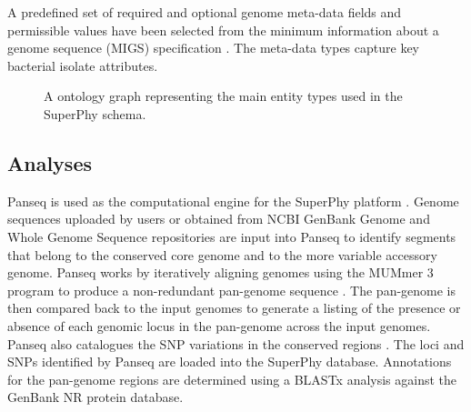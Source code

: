 \documentclass[a4paper,twoside]{article}
\begin{document}
A predefined set of required and optional genome meta-data fields and permissible values have been selected from the minimum information about a genome sequence (MIGS) specification \cite{field2008}. The meta-data types capture key bacterial isolate attributes.

\begin{figure}[t]
  \vspace{-0.2cm}
  \centering
   {}
  \caption{A ontology graph representing the main entity types used in the SuperPhy schema.}
  \label{fig:ontology}
\end{figure}

\subsection{Analyses}
\label{sec:pipeline}

Panseq is used as the computational engine for the SuperPhy platform \cite{laing_pan-genome_2010}. Genome sequences uploaded by users or obtained from NCBI GenBank Genome and Whole Genome Sequence repositories \cite{benson2013genbank} are input into Panseq to identify segments that belong to the conserved core genome and to the more variable accessory genome. Panseq works by iteratively aligning genomes using the MUMmer 3 program to produce a non-redundant pan-genome sequence \cite{laing_pan-genome_2010,kurtz2004versatile}. The pan-genome is then compared back to the input genomes to generate a listing of the presence or absence of each genomic locus in the pan-genome across the input genomes. Panseq also catalogues the SNP variations in the conserved regions \cite{laing_pan-genome_2010}.  The loci and SNPs identified by Panseq are loaded into the SuperPhy database. Annotations for the pan-genome regions are determined using a BLASTx analysis against the GenBank NR protein database.
\end{document}
